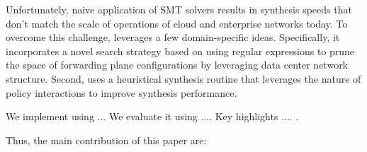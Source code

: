 Unfortunately, naive application of SMT solvers results in synthesis
speeds that don't match the scale of operations of cloud and
enterprise networks today.  To overcome this challenge, \Name leverages a few
domain-specific ideas.  Specifically, it incorporates a novel search
strategy based on using regular expressions to prune the space of
forwarding plane configurations by leveraging data center network
structure.  Second, \Name uses
a heuristical synthesis routine that leverages the nature of policy
interactions to improve synthesis performance.  


We implement \Name using ... We evaluate it using .... Key highlights .... .

Thus, the main contribution of this paper are: 

